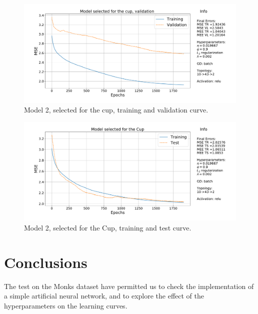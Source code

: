 \documentclass[11pt,twoside]{article}
\begin{document}
\begin{figure}[htbp]
  \centering
  \includegraphics[width=1.0\textwidth]{img/final_model_validation.pdf}
\caption{Model 2, selected for the cup, training and validation curve.}
\label{fig:initial-grid}
  \end{figure}


\begin{figure}[htbp]
  \centering
  \includegraphics[width=1.0\textwidth]{img/final_model.pdf}
\caption{Model 2, selected for the Cup, training and test curve.}
\label{fig:initial-grid}
  \end{figure}





\clearpage

\section{Conclusions} %
\label{sec:conclusions}

The test on the Monks dataset have permitted us to check the implementation of a simple artificial neural network, and to explore the effect of the hyperparameters on the learning curves.
\end{document}
